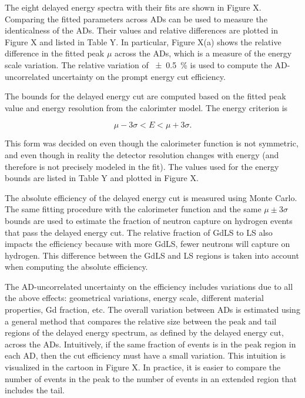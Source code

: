 \documentclass{ucbthesis}
\begin{document}
The eight delayed energy spectra with their fits are shown in Figure X. %
Comparing the fitted parameters across ADs can be used
to measure the identicalness of the ADs.
Their values and relative differences are plotted in Figure X %
and listed in Table Y. %
In particular, Figure X(a) shows the relative difference %
in the fitted peak $\mu$ across the ADs,
which is a measure of the energy scale variation.
The relative variation of \SI{+-0.5}{\percent}
is used to compute the AD-uncorrelated uncertainty
on the prompt energy cut efficiency.

The bounds for the delayed energy cut are computed
based on the fitted peak value and energy resolution
from the calorimter model. The energy criterion is

\begin{equation}
    \mu - 3\sigma < E < \mu + 3\sigma.
\end{equation}

This form was decided on even though the calorimeter function
is not symmetric, and even though in reality
the detector resolution changes with energy
(and therefore is not precisely modeled in the fit).
The values used for the energy bounds are listed in Table Y %
and plotted in Figure X. %

The absolute efficiency of the delayed energy cut
is measured using Monte Carlo.
The same fitting procedure with the calorimeter function
and the same $\mu \pm 3\sigma$ bounds are used to
estimate the fraction of neutron capture on hydrogen events
that pass the delayed energy cut.
The relative fraction of GdLS to LS also impacts the efficiency
because with more GdLS, fewer neutrons will capture on hydrogen.
This difference between the GdLS and LS regions is taken into account
when computing the absolute efficiency.

The AD-uncorrelated uncertainty on the efficiency
includes variations due to all the above effects:
geometrical variations, energy scale, different material properties,
Gd fraction, etc.
The overall variation between ADs is estimated using a general method
that compares the relative size between the peak and tail regions
of the delayed energy spectrum, as defined by the delayed energy cut,
across the ADs.
Intuitively, if the same fraction of events is in the peak region in each AD,
then the cut efficiency must have a small variation.
This intuition is visualized in the cartoon in Figure X. %
In practice, it is easier to compare the number of events in the peak
to the number of events in an extended region that includes the tail.
\end{document}
